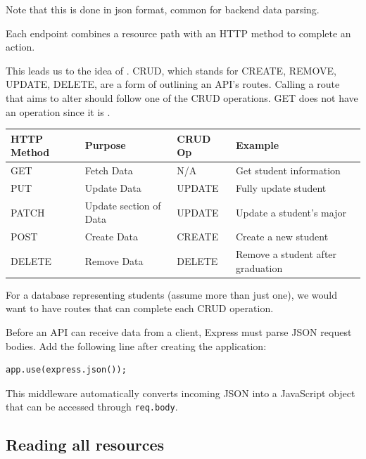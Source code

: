 Note that this is done in json format, common for backend data parsing.

Each endpoint combines a resource path with an HTTP method to complete an action.

This leads us to the idea of . CRUD, which stands for CREATE, 
REMOVE, UPDATE, DELETE, are a form of outlining an API's routes. Calling a route that 
aims to alter should follow one of the CRUD operations. GET does not have an operation 
since it is .

\begin{table}[]
  \begin{tabular}{|l|l|l|l|}
    \hline
    \textbf{HTTP Method} & \textbf{Purpose}       & \textbf{CRUD Op} & \textbf{Example}                  \\ \hline
    GET                  & Fetch Data             & N/A              & Get student information           \\ \hline
    PUT                  & Update Data            & UPDATE           & Fully update student              \\ \hline
    PATCH                & Update section of Data & UPDATE           & Update a student's major          \\ \hline
    POST                 & Create Data            & CREATE           & Create a new student              \\ \hline
    DELETE               & Remove Data            & DELETE           & Remove a student after graduation \\ \hline
  \end{tabular}
\end{table}

For a database representing students (assume more than just one), we would want to have 
routes that can complete each CRUD operation.

Before an API can receive data from a client, Express must parse JSON
request bodies. Add the following line after creating the application:

\begin{verbatim}
app.use(express.json());
\end{verbatim}

This middleware automatically converts incoming JSON into a JavaScript
object that can be accessed through \texttt{req.body}.

\subsection{Reading all resources}

